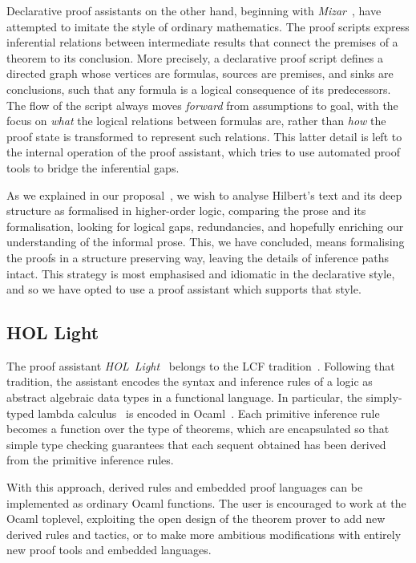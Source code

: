 Declarative proof assistants on the other hand, beginning with \emph{Mizar}~\cite{MizarMathematicalVernacular}, have attempted to imitate the style of ordinary mathematics. The proof scripts express inferential relations between intermediate results that connect the premises of a theorem to its conclusion. More precisely, a declarative proof script defines a directed graph whose vertices are formulas, sources are premises, and sinks are conclusions, such that any formula is a logical consequence of its predecessors. The flow of the script always moves \emph{forward} from assumptions to goal, with the focus on \emph{what} the logical relations between formulas are, rather than \emph{how} the proof state is transformed to represent such relations. This latter detail is left to the internal operation of the proof assistant, which tries to use automated proof tools to bridge the inferential gaps.

As we explained in our proposal~\cite{ScottPhdProposal}, we wish to analyse Hilbert's text and its deep structure as formalised in higher-order logic, comparing the prose and its formalisation, looking for logical gaps, redundancies, and hopefully enriching our understanding of the informal prose. This, we have concluded, means formalising the proofs in a structure preserving way, leaving the details of inference paths intact. This strategy is most emphasised and idiomatic in the declarative style, and so we have opted to use a proof assistant which supports that style.

\subsection{HOL Light}
The proof assistant \emph{HOL~Light}~\cite{HOLLight} belongs to the LCF tradition~\cite{LCFtoHOL}. Following that tradition, the assistant encodes the syntax and inference rules of a logic as abstract algebraic data types in a functional language. In particular, the simply-typed lambda calculus~\cite{ChurchTheoryOfTypes} is encoded in Ocaml~\cite{Ocaml}. Each primitive inference rule becomes a function over the type of theorems, which are encapsulated so that simple type checking guarantees that each sequent obtained has been derived from the primitive inference rules.

With this approach, derived rules and embedded proof languages can be implemented as ordinary Ocaml functions. The user is encouraged to work at the Ocaml toplevel, exploiting the open design of the theorem prover to add new derived rules and tactics, or to make more ambitious modifications with entirely new proof tools and embedded languages.


